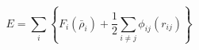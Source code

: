 \documentclass[12pt]{article}
\begin{document}
$$
  E = \sum_i \left\{ F_i(\bar{\rho}_i)
      + \frac{1}{2} \sum_{i \neq j} \phi_{ij} (r_{ij}) \right\}
$$
\end{document}

